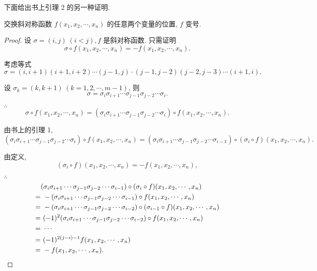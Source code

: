 \documentclass{ctexart}
\begin{document}
下面给出书上引理 2 的另一种证明.
\begin{lemma}[书上的引理 2]
    交换斜对称函数 $f(x_1,x_2,\cdots,x_n)$ 的任意两个变量的位置, $f$ 变号.
\end{lemma}
\begin{proof}
    设 $\sigma=(i,j)\ (i<j),f$ 是斜对称函数. 只需证明
    \[\sigma\circ f(x_1,x_2,\cdots,x_n)=-f(x_1,x_2,\cdots,x_n).\]

    考虑等式
    \[\sigma=(i,i+1)(i+1,i+2)\cdots(j-1,j)\cdot(j-1,j-2)(j-2,j-3)\cdots(i+1,i).\]

    设 $\sigma_k=(k,k+1)\ (k=1,2,\cdots,m-1)$, 则
    \[\sigma=\sigma_i\sigma_{i+1}\cdots\sigma_{j-1}\sigma_{j-2}\cdots\sigma_i.\]

    $\therefore$
    \[\sigma\circ f(x_1,x_2,\cdots,x_n)=(\sigma_i\sigma_{i+1}\cdots\sigma_{j-1}\sigma_{j-2}\cdots\sigma_i)\circ f(x_1,x_2,\cdots,x_n).\]

    由书上的引理 1,
    \[(\sigma_i\sigma_{i+1}\cdots\sigma_{j-1}\sigma_{j-2}\cdots\sigma_i)\circ f(x_1,x_2,\cdots,x_n)=(\sigma_i\sigma_{i+1}\cdots\sigma_{j-1}\sigma_{j-2}\cdots\sigma_{i-1})\circ(\sigma_i\circ f)(x_1,x_2,\cdots,x_n).\]

    由定义,
    \[(\sigma_i\circ f)(x_1,x_2,\cdots,x_n)=-f(x_1,x_2,\cdots,x_n),\]

    $\therefore$
    \begin{align*}
        & (\sigma_i\sigma_{i+1}\cdots\sigma_{j-1}\sigma_{j-2}\cdots\sigma_{i-1})\circ(\sigma_i\circ f)(x_1,x_2,\cdots,x_n)\\
        = & \ -(\sigma_i\sigma_{i+1}\cdots\sigma_{j-1}\sigma_{j-2}\cdots\sigma_{i-1})\circ f(x_1,x_2,\cdots,x_n) \\
        = & \ -(\sigma_i\sigma_{i+1}\cdots\sigma_{j-1}\sigma_{j-2}\cdots\sigma_{i-2})\circ(\sigma_{i-1}\circ f)(x_1,x_2,\cdots,x_n) \\
        = & \ (-1)^2(\sigma_i\sigma_{i+1}\cdots\sigma_{j-1}\sigma_{j-2}\cdots\sigma_{i-2})\circ f(x_1,x_2,\cdots,x_n) \\
        = & \ \cdots \\
        = & \ (-1)^{2(j-i)-1}f(x_1,x_2,\cdots,x_n) \\
        = & \ -f(x_1,x_2,\cdots,x_n).\qedhere
    \end{align*}
\end{proof}
\end{document}
